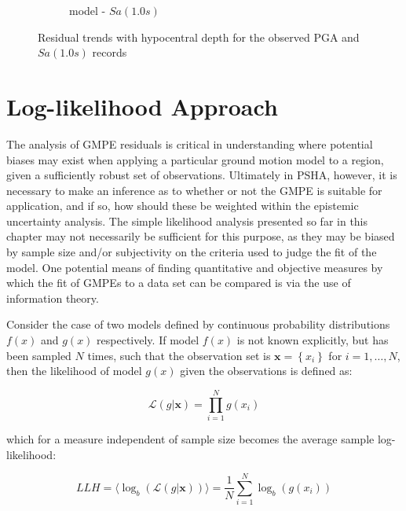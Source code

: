 \begin{figure}[htb]
\begin{subfigure}[b]{0.49\textwidth}
     \caption{\cite{Akkar_etal2014} model - $Sa \left( {1.0 s} \right)$}
      \label{fig:sa1_depth_akkar2014}
  \end{subfigure}
  \caption{Residual trends with hypocentral depth for the observed PGA and $Sa \left( {1.0 s} \right)$ records}
  \label{fig:depth_resid}
\end{figure}

\section{Log-likelihood Approach \cite{Scherbaum_etal2009}}
\label{sec:llh}

The analysis of GMPE residuals is critical in understanding where potential biases may exist when applying a particular ground motion model to a region, given a sufficiently robust set of observations. Ultimately in PSHA, however, it is necessary to make an inference as to whether or not the GMPE is suitable for application, and if so, how should these be weighted within the epistemic uncertainty analysis. The simple likelihood analysis presented so far in this chapter may not necessarily be sufficient for this purpose, as they may be biased by sample size and/or subjectivity on the criteria used to judge the fit of the model. One potential means of finding quantitative and objective measures by which the fit of GMPEs to a data set can be compared is via the use of information theory.

Consider the case of two models defined by continuous probability distributions $f \left( x \right)$ and $g \left( x \right)$ respectively. If model $f \left( x \right)$ is not known explicitly, but has been sampled $N$ times, such that the observation set is $\mathbf{x} = \left\{ {x_i} \right\}$ for $i = 1, \ldots, N$, then the likelihood of model $g \left( x \right)$ given the observations is defined as:

\begin{equation}
\mathcal{L}\left( {g | \mathbf{x}} \right) = \prod_{i=1}^{N} g \left( {x_i} \right)
\end{equation}

\noindent which for a measure independent of sample size becomes the average sample log-likelihood:

\begin{equation}
LLH = \langle \log_b \left( {\mathcal{L} \left( {g | \mathbf{x}} \right)} \right) \rangle = \frac{1}{N}\sum\limits_{i=1}^{N} \log_b \left( {g \left( {x_i} \right)} \right)
\end{equation}

